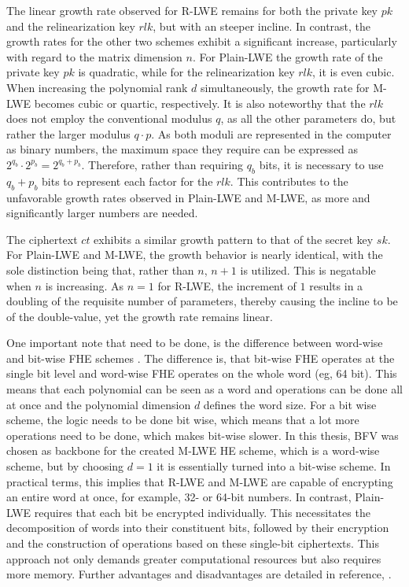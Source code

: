 The linear growth rate observed for R-LWE remains for both the private key $pk$ and the relinearization key $rlk$, but with an steeper incline. In contrast, the growth rates for the other two schemes exhibit a significant increase, particularly with regard to the matrix dimension $n$. For Plain-LWE the growth rate of the private key $pk$ is quadratic, while for the relinearization key $rlk$, it is even cubic. When increasing the polynomial rank $d$ simultaneously, the growth rate for M-LWE becomes cubic or quartic, respectively. It is also noteworthy that the $rlk$ does not employ the conventional modulus $q$, as all the other parameters do, but rather the larger modulus $q\cdot p$. As both moduli are represented in the computer as binary numbers, the maximum space they require can be expressed as $2^{q_b}\cdot 2^{p_b} = 2^{q_b+p_b}$. Therefore, rather than requiring $q_b$ bits, it is necessary to use $q_b+p_b$ bits to represent each factor for the $rlk$. This contributes to the unfavorable growth rates observed in Plain-LWE and M-LWE, as more and significantly larger numbers are needed.

The ciphertext $ct$ exhibits a similar growth pattern to that of the secret key $sk$. For Plain-LWE and M-LWE, the growth behavior is nearly identical, with the sole distinction being that, rather than $n$, $n+1$ is utilized. This is negatable when $n$ is increasing. As $n=1$ for R-LWE, the increment of $1$ results in a doubling of the requisite number of parameters, thereby causing the incline to be of the double-value, yet the growth rate remains linear.

One important note that need to be done, is the difference between word-wise and bit-wise FHE schemes \cite{WordBitWiseFhe}. The difference is, that bit-wise FHE operates at the single bit level and word-wise FHE operates on the whole word (eg, 64 bit). This means that each polynomial can be seen as a word and operations can be done all at once and the polynomial dimension $d$ defines the word size. For a bit wise scheme, the logic needs to be done bit wise, which means that a lot more operations need to be done, which makes bit-wise slower. In this thesis, BFV was chosen as backbone for the created M-LWE HE scheme, which is a word-wise scheme, but by choosing $d=1$ it is essentially turned into a bit-wise scheme. In practical terms, this implies that R-LWE and M-LWE are capable of encrypting an entire word at once, for example, 32- or 64-bit numbers. In contrast, Plain-LWE requires that each bit be encrypted individually. This necessitates the decomposition of words into their constituent bits, followed by their encryption and the construction of operations based on these single-bit ciphertexts. This approach not only demands greater computational resources but also requires more memory. Further advantages and disadvantages are detailed in reference, \cite{WordBitWiseFhe}. 

